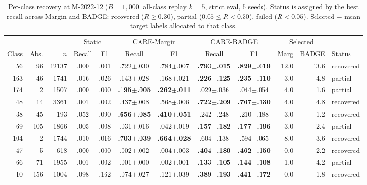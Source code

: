 \documentclass[journal]{IEEEtran}
\newcommand{\ours}{CARE}  %
\begin{document}
\begin{table}[t]
\centering
\caption{Per-class recovery at M-2022-12 ($B{=}1{,}000$, all-class replay $k{=}5$, strict eval, 5 seeds). Status is assigned by the best recall across Margin and BADGE: recovered ($R{\geq}0.30$), partial ($0.05{\leq}R{<}0.30$), failed ($R{<}0.05$). Selected = mean target labels allocated to that class.}
\label{tab:per_class_recovery}
\scriptsize
\setlength{\tabcolsep}{3.5pt}
\begin{tabular}{@{}r r r cc cc cc rr l@{}}
\toprule
& & & \multicolumn{2}{c}{Static} & \multicolumn{2}{c}{\ours{}-Margin} & \multicolumn{2}{c}{\ours{}-BADGE} & \multicolumn{2}{c}{Selected} & \\
\cmidrule(lr){4-5} \cmidrule(lr){6-7} \cmidrule(lr){8-9} \cmidrule(lr){10-11}
Class & Abs. & $n$ & Recall & F1 & Recall & F1 & Recall & F1 & Marg & BADGE & Status \\
\midrule
56  & 96  & 12137 & .000 & .001 & .722$\pm$.030 & .784$\pm$.007 & \textbf{.793$\pm$.015} & \textbf{.829$\pm$.019} & 12.0 & 13.6 & recovered \\
163 & 46  &  1741 & .016 & .026 & .143$\pm$.028 & .168$\pm$.021 & \textbf{.226$\pm$.125} & \textbf{.235$\pm$.110} &  3.0 &  4.8 & partial \\
174 &  2  &  1507 & .000 & .000 & \textbf{.195$\pm$.005} & \textbf{.262$\pm$.011} & .029$\pm$.036 & .044$\pm$.054 &  4.0 &  1.6 & partial \\
48  & 14  &  3361 & .001 & .002 & .437$\pm$.008 & .568$\pm$.006 & \textbf{.722$\pm$.209} & \textbf{.767$\pm$.130} &  4.0 &  4.8 & recovered \\
38  & 45  &   193 & .052 & .090 & \textbf{.656$\pm$.085} & \textbf{.410$\pm$.051} & .242$\pm$.248 & .210$\pm$.188 &  3.0 &  1.2 & recovered \\
69  & 105 &  1866 & .005 & .008 & .031$\pm$.016 & .042$\pm$.019 & \textbf{.157$\pm$.182} & \textbf{.177$\pm$.196} &  3.0 &  2.4 & partial \\
104 &  2  &  1744 & .010 & .016 & \textbf{.703$\pm$.039} & \textbf{.664$\pm$.028} & .604$\pm$.138 & .594$\pm$.065 &  8.0 &  3.6 & recovered \\
47  &  5  &   618 & .000 & .000 & .002$\pm$.002 & .004$\pm$.003 & \textbf{.404$\pm$.180} & \textbf{.462$\pm$.150} &  0.0 &  2.2 & recovered \\
66  & 71  &  1955 & .001 & .002 & .001$\pm$.000 & .002$\pm$.001 & \textbf{.133$\pm$.105} & \textbf{.144$\pm$.108} &  1.0 &  4.2 & partial \\
10  & 156 &  1004 & .098 & .162 & .074$\pm$.027 & .121$\pm$.039 & \textbf{.389$\pm$.193} & \textbf{.441$\pm$.172} &  0.0 &  1.8 & recovered \\

\end{tabular}
\end{table}
\end{document}
